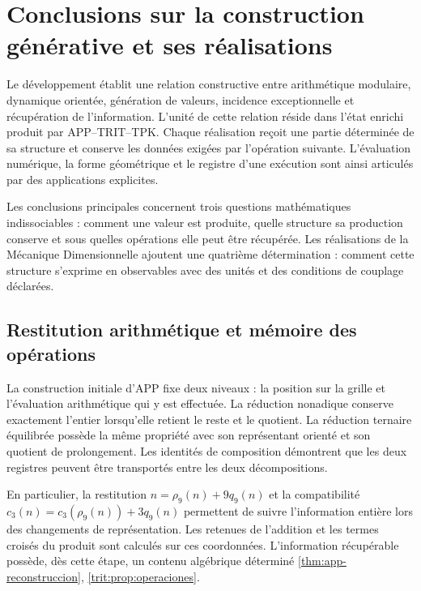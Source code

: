 \chapter{Conclusions sur la construction générative et ses réalisations}
\label{hmt:sistematica:conclusiones}

Le développement établit une relation constructive entre arithmétique modulaire, dynamique orientée, génération de valeurs, incidence exceptionnelle et récupération de l’information. L’unité de cette relation réside dans l’état enrichi produit par APP--TRIT--TPK. Chaque réalisation reçoit une partie déterminée de sa structure et conserve les données exigées par l’opération suivante. L’évaluation numérique, la forme géométrique et le registre d’une exécution sont ainsi articulés par des applications explicites.

Les conclusions principales concernent trois questions mathématiques indissociables : comment une valeur est produite, quelle structure sa production conserve et sous quelles opérations elle peut être récupérée. Les réalisations de la Mécanique Dimensionnelle ajoutent une quatrième détermination : comment cette structure s’exprime en observables avec des unités et des conditions de couplage déclarées.

\section{Restitution arithmétique et mémoire des opérations}

La construction initiale d’APP fixe deux niveaux : la position sur la grille et l’évaluation arithmétique qui y est effectuée. La réduction nonadique conserve exactement l’entier lorsqu’elle retient le reste et le quotient. La réduction ternaire équilibrée possède la même propriété avec son représentant orienté et son quotient de prolongement. Les identités de composition démontrent que les deux registres peuvent être transportés entre les deux décompositions.

En particulier, la restitution \(n=\rho_9(n)+9q_9(n)\) et la compatibilité \(c_3(n)=c_3(\rho_9(n))+3q_9(n)\) permettent de suivre l’information entière lors des changements de représentation. Les retenues de l’addition et les termes croisés du produit sont calculés sur ces coordonnées. L’information récupérable possède, dès cette étape, un contenu algébrique déterminé \ref{thm:app-reconstruccion}, \ref{trit:prop:operaciones}.

